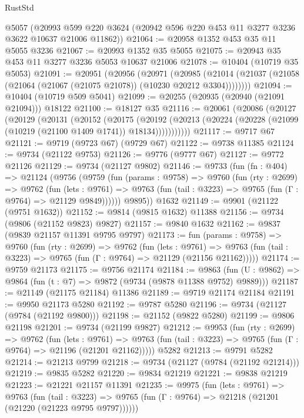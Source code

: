 \begin{lexlean}{RustStd}
\begin{coremodule}
    @5057
    (@20993 @599 @220 @3624 (@20942 @596 @220 @453 @11 @3277 @3236 @3622 @10637 @21006 @11862))
@21064 := @20958 @1352 @453 @35 @11 @5055 @3236
@21067 := @20993 @1352 @35 @5055
@21075 := @20943 @35 @453 @11 @3277 @3236 @5053 @10637 @21006
@21078 := @10404 (@10719 @35 @5053)
@21091 := @20951
    (@20956
      (@20971
        (@20985
          (@21014 (@21037 (@21058 (@21064 (@21067 (@21075 @21078)) (@10230 @20212 @3304))))))))
@21094 := @10404 (@10719 @509 @5041)
@21099 := @20255 (@20935 (@20940 (@21091 @21094))) @18122
@21100 := @18127 @35
@21116 := @20061
    (@20086
      (@20127
        (@20129
          (@20131
            (@20152
              (@20175
                (@20192
                  (@20213 (@20224 (@20228 (@21099 (@10219 (@21100 @1409 @1741)) @18134)))))))))))
@21117 := @9717 @67
@21121 := @9719 (@9723 @67) (@9729 @67)
@21122 := @9738 @11385
@21124 := @9734 (@21122 @9753)
@21126 := @9776 (@9777 @67)
@21127 := @9772 @21126
@21129 := @9734 (@21127 @9802)
@21146 := @9733
    (fun (fn : @404) =>
    @21124
      (@9756
        (@9759
          (fun (params : @9758) =>
          @9760
            (fun (rty : @2699) =>
            @9762
              (fun (lets : @9761) =>
              @9763 (fun (tail : @3223) => @9765 (fun (Γ : @9764) => @21129 @9849))))))
        @9895))
    @1632
@21149 := @9901 (@21122 (@9751 @1632))
@21152 := @9814 (@9815 @1632) @11388
@21156 := @9734 (@9806 (@21152 @9823) @9827)
@21157 := @9840 @1632
@21162 := @9837 (@9839 @21157 @11391 @9795 @9797)
@21173 := fun (params : @9758) =>
  @9760
    (fun (rty : @2699) =>
    @9762
      (fun (lets : @9761) =>
      @9763 (fun (tail : @3223) => @9765 (fun (Γ : @9764) => @21129 (@21156 @21162)))))
@21174 := @9759 @21173
@21175 := @9756 @21174
@21184 := @9863
    (fun (U : @9862) => @9864 (fun (t : @7) => @9872 (@9734 (@9878 @11388 @9752) @9889)))
@21187 := @21149 (@21175 @21184) @11386
@21189 := @9719 @21174 @21184
@21191 := @9950 @21173 @5280
@21192 := @9787 @5280
@21196 := @9734 (@21127 (@9784 (@21192 @9800)))
@21198 := @21152 (@9822 @5280)
@21199 := @9806 @21198
@21201 := @9734 (@21199 @9827)
@21212 := @9953
    (fun (rty : @2699) =>
    @9762
      (fun (lets : @9761) =>
      @9763 (fun (tail : @3223) => @9765 (fun (Γ : @9764) => @21196 (@21201 @21162)))))
    @5282
@21213 := @9791 @5282
@21214 := @21213 @9799
@21218 := @9734 (@21127 (@9784 (@21192 @21214)))
@21219 := @9835 @5282
@21220 := @9834 @21219
@21221 := @9838 @21219
@21223 := @21221 @21157 @11391
@21235 := @9975
    (fun (lets : @9761) =>
    @9763
      (fun (tail : @3223) =>
      @9765 (fun (Γ : @9764) => @21218 (@21201 (@21220 (@21223 @9795 @9797))))))

\end{coremodule}
\end{lexlean}
